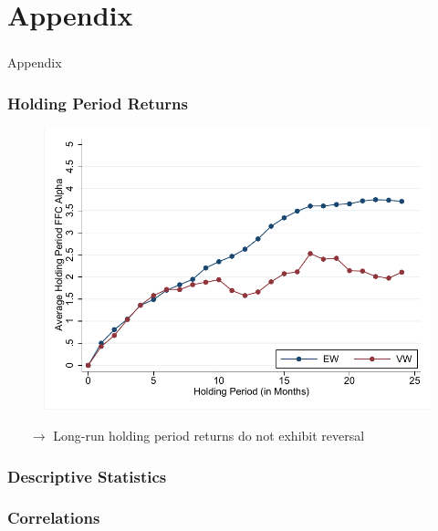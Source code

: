 \documentclass{beamer}
\begin{document}
	\section{Appendix}
	\begin{frame}
		\centering
		\frametitle{}
	\huge{Appendix}
	\end{frame}
	
\begin{frame}

\frametitle{Holding Period Returns}

\begin{figure}[htbp]
	\centering
	\includegraphics[scale=0.7,trim=4 4 4 4,clip]{figures/longrun_retrf_alpha_susir_11.pdf} 
	\label{tab:cumLS}%
\end{figure}
		\vspace*{-0.4cm}
\begin{itemize}
\item[$\rightarrow$] Long-run holding period returns do not exhibit reversal
\end{itemize}
\end{frame}
	


\begin{frame}
	\frametitle{Descriptive Statistics}
\begin{table}[htbp]
  \centering
  \footnotesize
	  \resizebox{0.9\textwidth}{!}{
	
	\label{tab:summary}%
	}
\end{table}
	\end{frame}

\begin{frame}

\frametitle{Correlations}
 \resizebox{0.6\textwidth}{!}{
	\centering
	 
	\label{tab:cumLS}%
}
\end{frame}
	


	
	
\end{document}
